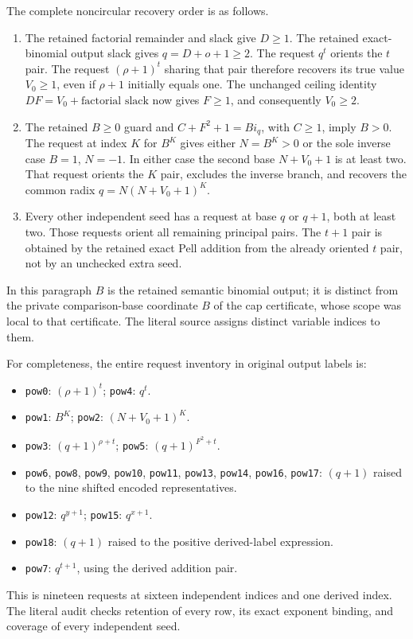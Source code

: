 The complete noncircular recovery order is as follows.
\begin{enumerate}
\item The retained factorial remainder and slack give $D\geq1$.
The retained exact-binomial output slack gives $q=D+o+1\geq2$.
The request $q^t$ orients the $t$ pair. The request
$(\rho+1)^t$ sharing that pair therefore recovers its true value
$V_0\geq1$, even if $\rho+1$ initially equals one. The unchanged
ceiling identity $DF=V_0+\text{factorial slack}$ now gives
$F\geq1$, and consequently $V_0\geq2$.
\item The retained $B\geq0$ guard and
$C+F^2+1=B i_q$, with $C\geq1$, imply $B>0$. The request at
index $K$ for $B^K$ gives either $N=B^K>0$ or the sole inverse
case $B=1$, $N=-1$. In either case the second base
$N+V_0+1$ is at least two. That request orients the $K$ pair,
excludes the inverse branch, and recovers the common radix
$q=N(N+V_0+1)^K$.
\item Every other independent seed has a request at base $q$ or
$q+1$, both at least two. Those requests orient all remaining
principal pairs. The $t+1$ pair is obtained by the retained exact
Pell addition from the already oriented $t$ pair, not by an
unchecked extra seed.
\end{enumerate}
In this paragraph $B$ is the retained semantic binomial output;
it is distinct from the private comparison-base coordinate $B$
of the cap certificate, whose scope was local to that certificate.
The literal source assigns distinct variable indices to them.

For completeness, the entire request inventory in original output
labels is:
\begin{itemize}
\item \texttt{pow0}: $(\rho+1)^t$; \texttt{pow4}: $q^t$.
\item \texttt{pow1}: $B^K$; \texttt{pow2}: $(N+V_0+1)^K$.
\item \texttt{pow3}: $(q+1)^{\rho+t}$;
      \texttt{pow5}: $(q+1)^{F^2+t}$.
\item \texttt{pow6}, \texttt{pow8}, \texttt{pow9}, \texttt{pow10},
\texttt{pow11}, \texttt{pow13}, \texttt{pow14}, \texttt{pow16},
\texttt{pow17}: $(q+1)$ raised to the nine shifted encoded
representatives.
\item \texttt{pow12}: $q^{y+1}$;
      \texttt{pow15}: $q^{x+1}$.
\item \texttt{pow18}: $(q+1)$ raised to the positive
      derived-label expression.
\item \texttt{pow7}: $q^{t+1}$, using the derived addition pair.
\end{itemize}
This is nineteen requests at sixteen independent indices and one
derived index. The literal audit checks retention of every row,
its exact exponent binding, and coverage of every independent seed.

